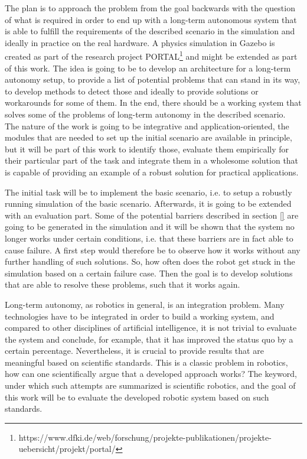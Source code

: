 \documentclass[german, master, expose, latin1]{base/thesis_KBS}
\begin{document}
The plan is to approach the problem from the goal backwards with the question of what is required in order to end up with a long-term autonomous system that is
able to fulfill the requirements of the described scenario in the simulation and ideally in practice on the real hardware.
A physics simulation in Gazebo is created as part of the research project PORTAL\footnote{https://www.dfki.de/web/forschung/projekte-publikationen/projekte-uebersicht/projekt/portal/}
and might be extended as part of this work. The idea is going to be to develop an architecture for a long-term autonomy setup, to provide a list of potential problems
that can stand in its way, to develop methods to detect those and ideally to provide solutions or workarounds for some of them.
In the end, there should be a working system that solves some of the problems of long-term autonomy in the described scenario.
The nature of the work is going to be integrative and application-oriented, the modules that are needed to set up the initial scenario are available in principle, 
but it will be part of this work to identify those, evaluate them empirically for their particular part of the task and integrate them in a wholesome solution
that is capable of providing an example of a robust solution for practical applications.

The initial task will be to implement the basic scenario, i.e. to setup a robustly running simulation of the basic scenario.
Afterwards, it is going to be extended with an evaluation part. Some of the potential barriers described in section \ref{} are going to be generated
in the simulation and it will be shown that the system no longer works under certain conditions, i.e. that these barriers are in fact able to cause failure.
A first step would therefore be to observe how it works without any further handling of such solutions. So, how often does the robot get stuck in the simulation 
based on a certain failure case. Then the goal is to develop solutions that are able to resolve these problems, such that it works again.

Long-term autonomy, as robotics in general, is an integration problem. Many technologies have to be integrated in order to build a working system, and compared to
other disciplines of artificial intelligence, it is not trivial to evaluate the system and conclude, for example, that it has improved the status quo by a certain percentage.
Nevertheless, it is crucial to provide results that are meaningful based on scientific standards. This is a classic problem in robotics, 
how can one scientifically argue that a developed approach works? The keyword, under which such attempts are summarized is scientific robotics, 
and the goal of this work will be to evaluate the developed robotic system based on such standards.
\end{document}
